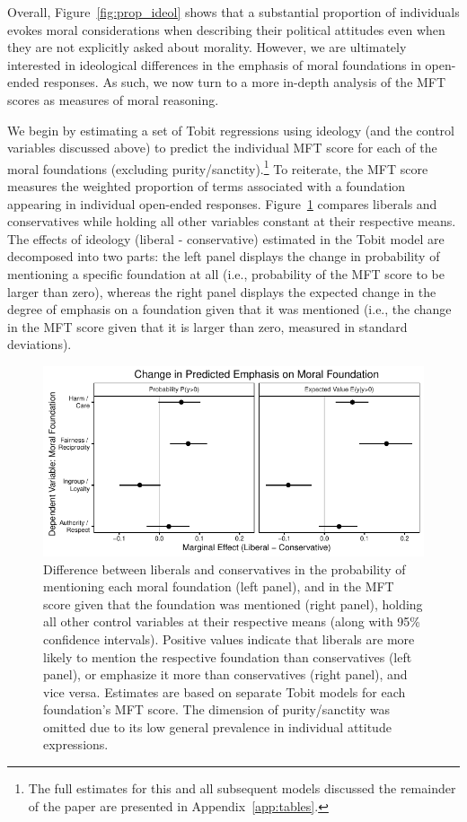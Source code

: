 \documentclass[12pt]{article}
\begin{document}
Overall, Figure~\ref{fig:prop_ideol} shows that a substantial proportion of individuals evokes moral considerations when describing their political attitudes even when they are not explicitly asked about morality. However, we are ultimately interested in ideological differences in the emphasis of moral foundations in open-ended responses. As such, we now turn to a more in-depth analysis of the MFT scores as measures of moral reasoning.

We begin by estimating a set of Tobit regressions using ideology (and the control variables discussed above) to predict the individual MFT score for each of the moral foundations (excluding purity/sanctity).\footnote{The full estimates for this and all subsequent models discussed the remainder of the paper are presented in Appendix~\ref{app:tables}.} To reiterate, the MFT score measures the weighted proportion of terms associated with a foundation appearing in individual open-ended responses. Figure~\ref{fig:tobit_ideol} compares liberals and conservatives while holding all other variables constant at their respective means. The effects of ideology (liberal - conservative) estimated in the Tobit model are decomposed into two parts: the left panel displays the change in probability of mentioning a specific foundation at all (i.e., probability of the MFT score to be larger than zero), whereas the right panel displays the expected change in the degree of emphasis on a foundation given that it was mentioned  (i.e., the change in the MFT score given that it is larger than zero, measured in standard deviations).

\begin{figure}[ht]\centering
\includegraphics{../calc/fig/tobit_ideol.pdf}
\caption{Difference between liberals and conservatives in the probability of mentioning each moral foundation (left panel), and in the MFT score given that the foundation was mentioned (right panel), holding all other control variables at their respective means (along with 95\% confidence intervals). Positive values indicate that liberals are more likely to mention the respective foundation than conservatives (left panel), or emphasize it more than conservatives (right panel), and vice versa. Estimates are based on separate Tobit models for each foundation's MFT score. The dimension of purity/sanctity was omitted due to its low general prevalence in individual attitude expressions. %
}\label{fig:tobit_ideol}
\end{figure}
\end{document}

